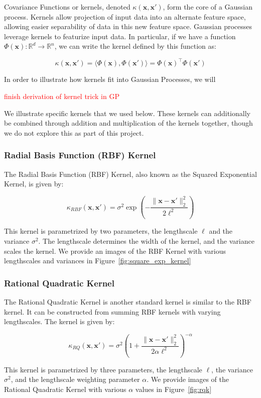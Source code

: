 \documentclass{article}
\newcommand{\R}{\mathbb{R}}
\newcommand{\bx}{\boldsymbol{x}}
\newcommand{\todo}[1]{\textcolor{red}{#1}}
\begin{document}
Covariance Functions or kernels, denoted $\kappa(\bx, \bx')$, form the core of a Gaussian process. Kernels allow
projection of input data into an alternate feature space, allowing easier separability of data in this new feature
space. Gaussian processes leverage kernels to featurize input data. In particular, if we have a function
$\Phi(\bx): \R^d \rightarrow \R^n$, we can write the kernel defined by this function as:

\[
  \kappa(\bx, \bx') = \langle \Phi(\bx), \Phi(\bx') \rangle = \Phi(\bx)^\top \Phi(\bx')
\]

In order to illustrate how kernels fit into Gaussian Processes, we will 

\todo{finish derivation of kernel trick in GP}

We illustrate specific kernels that we used below. These kernels can additionally be combined through addition and
multiplication of the kernels together, though we do not explore this as part of this project.

\subsubsection{Radial Basis Function (RBF) Kernel}

The Radial Basis Function (RBF) Kernel, also known as the Squared Exponential Kernel, is given by:

\[
  \kappa_{RBF}(\bx, \bx') = \sigma^2 \exp\left( - \frac{\|\bx -\bx' \|_{2}^{2}}{2 \ell^2} \right)
\]

This kernel is parametrized by two parameters, the lengthscale $\ell$ and the variance $\sigma^2$. The lengthscale
determines the width of the kernel, and the variance scales the kernel\cite{duvenaud_automatic_2014}. We provide an
images of the RBF Kernel with various lengthscales and variances in Figure~\ref{fig:square_exp_kernel}

\subsubsection{Rational Quadratic Kernel}

The Rational Quadratic Kernel is another standard kernel is similar to the RBF kernel. It can be constructed from
summing RBF kernels with varying lengthscales. The kernel is given by:

\[
  \kappa_{RQ}(\bx, \bx') = \sigma^2 \left( 1 + \frac{\| \bx - \bx' \|_{2}^{2}}{2 \alpha \ell^2} \right)^{-\alpha}
\]

This kernel is parametrized by three parameters, the lengthscale $\ell$, the variance $\sigma^2$, and the lengthscale
weighting parameter $\alpha$\cite{duvenaud_automatic_2014}. We provide images of the Rational Quadratic Kernel with
various $\alpha$ values in Figure~\ref{fig:rqk}
\end{document}
